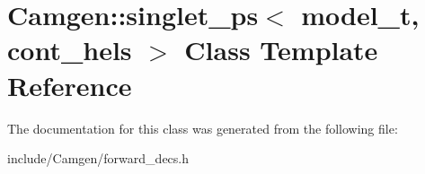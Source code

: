 \hypertarget{a00497}{\section{Camgen\-:\-:singlet\-\_\-ps$<$ model\-\_\-t, cont\-\_\-hels $>$ Class Template Reference}
\label{a00497}
}


The documentation for this class was generated from the following file\-:\begin{DoxyCompactItemize}
\item 
include/\-Camgen/forward\-\_\-decs.\-h\end{DoxyCompactItemize}
